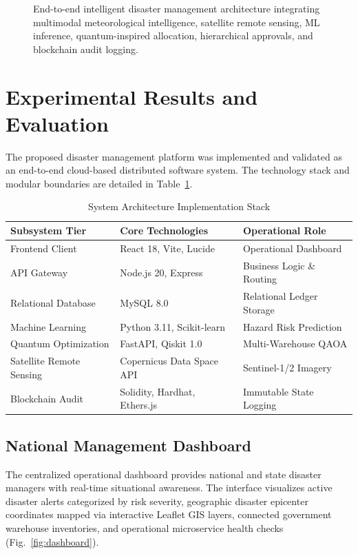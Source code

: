 \documentclass[conference]{IEEEtran}
\begin{document}
\begin{figure}[!t]
\centering
\fbox{\rule{0pt}{2.2in} \rule{0.95\linewidth}{0pt}}
\caption{End-to-end intelligent disaster management architecture integrating multimodal meteorological intelligence, satellite remote sensing, ML inference, quantum-inspired allocation, hierarchical approvals, and blockchain audit logging.}
\label{fig:arch}
\end{figure}

\section{Experimental Results and Evaluation}
The proposed disaster management platform was implemented and validated as an end-to-end cloud-based distributed software system. The technology stack and modular boundaries are detailed in Table~\ref{tab:tech_stack}.

\begin{table}[h]
\centering
\caption{System Architecture Implementation Stack}
\label{tab:tech_stack}
\begin{tabular}{lll}
\toprule
\textbf{Subsystem Tier} & \textbf{Core Technologies} & \textbf{Operational Role} \\
\midrule
Frontend Client & React 18, Vite, Lucide & Operational Dashboard \\
API Gateway & Node.js 20, Express & Business Logic \& Routing \\
Relational Database & MySQL 8.0 & Relational Ledger Storage \\
Machine Learning & Python 3.11, Scikit-learn & Hazard Risk Prediction \\
Quantum Optimization & FastAPI, Qiskit 1.0 & Multi-Warehouse QAOA \\
Satellite Remote Sensing & Copernicus Data Space API & Sentinel-1/2 Imagery \\
Blockchain Audit & Solidity, Hardhat, Ethers.js & Immutable State Logging \\
\bottomrule
\end{tabular}
\end{table}

\subsection{National Management Dashboard}
The centralized operational dashboard provides national and state disaster managers with real-time situational awareness. The interface visualizes active disaster alerts categorized by risk severity, geographic disaster epicenter coordinates mapped via interactive Leaflet GIS layers, connected government warehouse inventories, and operational microservice health checks (Fig.~\ref{fig:dashboard}).
\end{document}
